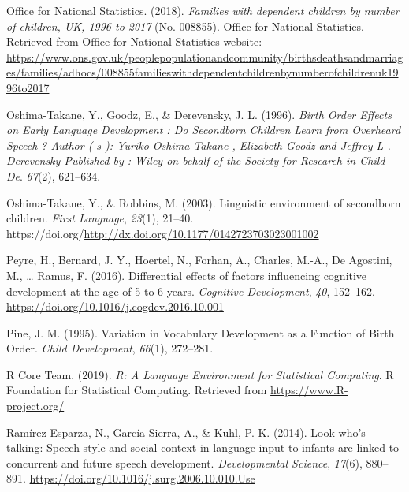 \documentclass[
  man,mask,floatsintext]{apa6}
\newlength{\cslhangindent}
\newlength{\cslentryspacingunit} %
\newenvironment{CSLReferences}[2] %
 {%
  \setlength{\parindent}{0pt}
  \ifodd #1
  \let\oldpar\par
  \def\par{\hangindent=\cslhangindent\oldpar}
  \fi
  \setlength{\parskip}{#2\cslentryspacingunit}
 }%
 {}
\begin{document}
\begin{CSLReferences}{1}{0}
\leavevmode{}%
Office for National Statistics. (2018). \emph{Families with dependent children by number of children, {UK}, 1996 to 2017} (No. 008855). Office for National Statistics. Retrieved from Office for National Statistics website: \url{https://www.ons.gov.uk/peoplepopulationandcommunity/birthsdeathsandmarriages/families/adhocs/008855familieswithdependentchildrenbynumberofchildrenuk1996to2017}

\leavevmode{}%
Oshima-Takane, Y., Goodz, E., \& Derevensky, J. L. (1996). \emph{Birth {Order} {Effects} on {Early} {Language} {Development} : {Do} {Secondborn} {Children} {Learn} from {Overheard} {Speech} ? {Author} ( s ): {Yuriko} {Oshima}-{Takane} , {Elizabeth} {Goodz} and {Jeffrey} {L} . {Derevensky} {Published} by : {Wiley} on behalf of the {Society} for {Research} in {Child} {De}}. \emph{67}(2), 621--634.

\leavevmode{}%
Oshima-Takane, Y., \& Robbins, M. (2003). Linguistic environment of secondborn children. \emph{First Language}, \emph{23}(1), 21--40. https://doi.org/\url{http://dx.doi.org/10.1177/0142723703023001002}

\leavevmode{}%
Peyre, H., Bernard, J. Y., Hoertel, N., Forhan, A., Charles, M.-A., De Agostini, M., \ldots{} Ramus, F. (2016). Differential effects of factors influencing cognitive development at the age of 5-to-6 years. \emph{Cognitive Development}, \emph{40}, 152--162. \url{https://doi.org/10.1016/j.cogdev.2016.10.001}

\leavevmode{}%
Pine, J. M. (1995). Variation in {Vocabulary} {Development} as a {Function} of {Birth} {Order}. \emph{Child Development}, \emph{66}(1), 272--281.

\leavevmode{}%
R Core Team. (2019). \emph{R: {A} {Language} {Environment} for {Statistical} {Computing}}. R Foundation for Statistical Computing. Retrieved from \url{https://www.R-project.org/}

\leavevmode{}%
Ramírez-Esparza, N., García-Sierra, A., \& Kuhl, P. K. (2014). Look who's talking: Speech style and social context in language input to infants are linked to concurrent and future speech development. \emph{Developmental Science}, \emph{17}(6), 880--891. \url{https://doi.org/10.1016/j.surg.2006.10.010.Use}


\end{CSLReferences}
\end{document}
